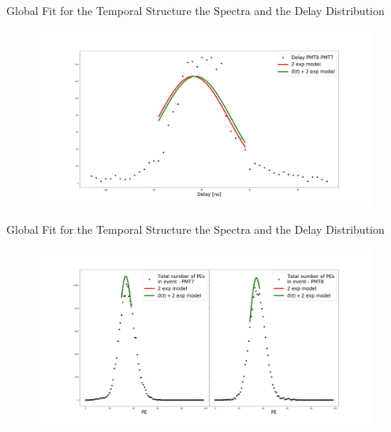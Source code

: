 \documentclass{beamer}
\begin{document}
\begin{frame}{Global Fit for the Temporal Structure the Spectra and the Delay Distribution}
\begin{figure}[h]
\includegraphics[width=1\textwidth]{delay_fit1.png}
\end{figure}
\end{frame}

\begin{frame}{Global Fit for the Temporal Structure the Spectra and the Delay Distribution}
\begin{figure}[h]
\includegraphics[width=1\textwidth]{spectra_fit1.png}
\end{figure}
\end{frame}
\end{document}
